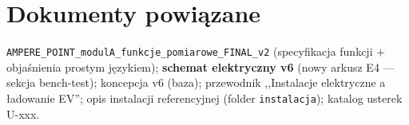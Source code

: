 \documentclass[11pt,a4paper]{article}
\begin{document}
\section{Dokumenty powiązane}
\texttt{AMPERE\_POINT\_modulA\_funkcje\_pomiarowe\_FINAL\_v2} (specyfikacja funkcji $+$
objaśnienia prostym językiem); \textbf{schemat elektryczny v6} (nowy arkusz E4 --- sekcja
bench-test); koncepcja v6 (baza); przewodnik ,,Instalacje elektryczne a ładowanie EV'';
opis instalacji referencyjnej (folder \texttt{instalacja}); katalog usterek U-xxx.
\end{document}
